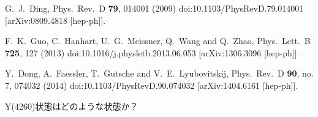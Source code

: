 \documentclass[a4j]{jarticle}
\begin{document}
\begin{thebibliography}{9}

 G.~J.~Ding,
 Phys.\ Rev.\ D {\bf 79}, 014001 (2009)
 doi:10.1103/PhysRevD.79.014001
 [arXiv:0809.4818 [hep-ph]].

 F.~K.~Guo, C.~Hanhart, U.~G.~Meissner, Q.~Wang and Q.~Zhao,
 Phys.\ Lett.\ B {\bf 725}, 127 (2013)
 doi:10.1016/j.physletb.2013.06.053
 [arXiv:1306.3096 [hep-ph]].



 Y.~Dong, A.~Faessler, T.~Gutsche and V.~E.~Lyubovitskij,
 Phys.\ Rev.\ D {\bf 90}, no. 7, 074032 (2014)
 doi:10.1103/PhysRevD.90.074032
 [arXiv:1404.6161 [hep-ph]].
 
\end{thebibliography}

\par
\vspace*{5mm}
Y(4260)状態はどのような状態か？
\end{document}
